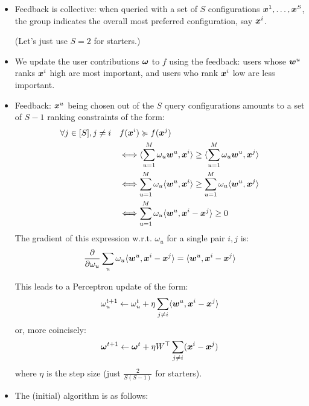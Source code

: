 \documentclass[12pt,a4paper]{article}
\begin{document}
\begin{itemize}

    \item Feedback is collective: when queried with a set of $S$ configurations
        $\boldsymbol{x}^1, \ldots, \boldsymbol{x}^S$, the group indicates the overall most preferred
        configuration, say $\boldsymbol{x}^i$.

        (Let's just use $S = 2$ for starters.)

    \item We update the user contributions $\boldsymbol{\omega}$ to $f$ using the
        feedback: users whose $\boldsymbol{w}^u$ ranks $\boldsymbol{x}^i$ high are most important,
        and users who rank $\boldsymbol{x}^i$ low are less important.

    \item Feedback: $\boldsymbol{x}^u$ being chosen out of the $S$ query configurations
        amounts to a set of $S - 1$ ranking constraints of the form:
        \begin{align*}
            \forall j \in [S], j \ne i
                & \quad f(\boldsymbol{x}^i) \succcurlyeq f(\boldsymbol{x}^j)    \\
                & \quad \Longleftrightarrow \langle \sum_{u=1}^M \omega_u \boldsymbol{w}^u, \boldsymbol{x}^i \rangle \ge \langle \sum_{u=1}^M \omega_u \boldsymbol{w}^u, \boldsymbol{x}^j \rangle \\
                & \quad \Longleftrightarrow  \sum_{u=1}^M \omega_u \langle \boldsymbol{w}^u, \boldsymbol{x}^i \rangle \ge \sum_{u=1}^M \omega_u \langle \boldsymbol{w}^u, \boldsymbol{x}^j \rangle \\
                & \quad \Longleftrightarrow  \sum_{u=1}^M \omega_u \langle \boldsymbol{w}^u, \boldsymbol{x}^i - \boldsymbol{x}^j \rangle \ge 0
        \end{align*}
        The gradient of this expression w.r.t. $\omega_u$ for a single pair
        $i, j$ is:
        $$ \frac{\partial}{\partial \omega_u} \sum_u \omega_u \langle \boldsymbol{w}^u, \boldsymbol{x}^i - \boldsymbol{x}^j \rangle = \langle \boldsymbol{w}^u, \boldsymbol{x}^i - \boldsymbol{x}^j \rangle $$

        This leads to a Perceptron update of the form:
        $$ \omega^{t+1}_u \gets \omega^t_u + \eta \sum_{j \ne i} \langle \boldsymbol{w}^u, \boldsymbol{x}^i - \boldsymbol{x}^j \rangle $$
        or, more coincisely:
        $$ \boldsymbol{\omega}^{t+1} \gets \boldsymbol{\omega}^t + \eta W^\top \sum_{j \ne i} (\boldsymbol{x}^i - \boldsymbol{x}^j) $$
        where $\eta$ is the step size (just $\frac{2}{S(S - 1)}$ for starters).

    \item The (initial) algorithm is as follows:

        \begin{itemize}


\end{itemize}
\end{itemize}
\end{document}
